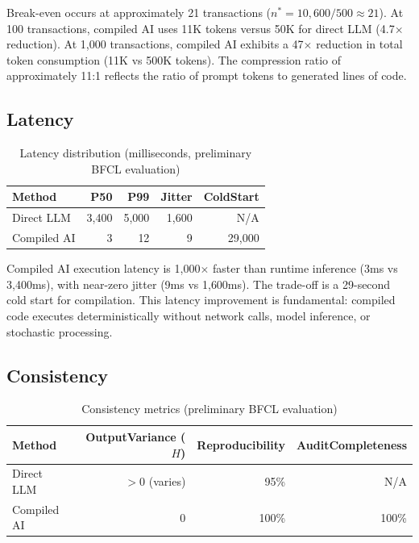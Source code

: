 \documentclass[11pt]{article}
\begin{document}
Break-even occurs at approximately 21 transactions ($n^* = 10{,}600 / 500 \approx 21$). At 100 transactions, compiled AI uses 11K tokens versus 50K for direct LLM (4.7$\times$ reduction). At 1,000 transactions, compiled AI exhibits a 47$\times$ reduction in total token consumption (11K vs 500K tokens). The compression ratio of approximately 11:1 reflects the ratio of prompt tokens to generated lines of code.

\subsection{Latency}

\begin{table}[ht]
\centering
\caption{Latency distribution (milliseconds, preliminary BFCL evaluation)}
\label{tab:latency-results}
\begin{tabular}{lrrrr}
\toprule
Method & P50 & P99 & Jitter & ColdStart \\
\midrule
Direct LLM & 3,400 & 5,000 & 1,600 & N/A \\
Compiled AI & 3 & 12 & 9 & 29,000 \\
\bottomrule
\end{tabular}
\end{table}

Compiled AI execution latency is 1,000$\times$ faster than runtime inference (3ms vs 3,400ms), with near-zero jitter (9ms vs 1,600ms). The trade-off is a 29-second cold start for compilation. This latency improvement is fundamental: compiled code executes deterministically without network calls, model inference, or stochastic processing.

\subsection{Consistency}

\begin{table}[ht]
\centering
\caption{Consistency metrics (preliminary BFCL evaluation)}
\label{tab:consistency-results}
\begin{tabular}{lrrr}
\toprule
Method & OutputVariance ($H$) & Reproducibility & AuditCompleteness \\
\midrule
Direct LLM & $>$0 (varies) & 95\% & N/A \\
Compiled AI & 0 & 100\% & 100\% \\
\bottomrule
\end{tabular}
\end{table}
\end{document}
